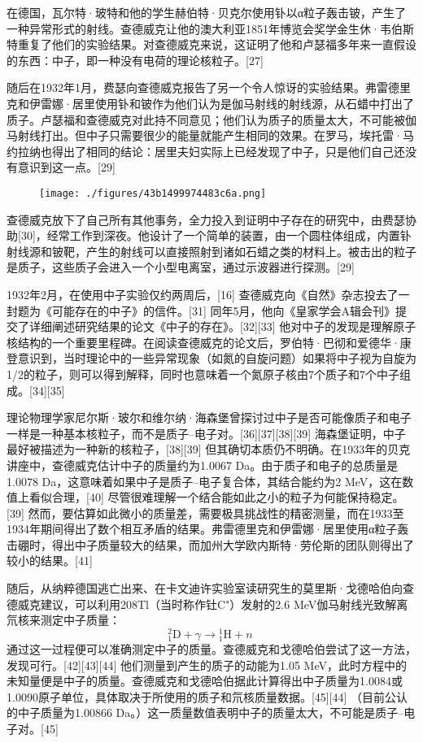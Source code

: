 在德国，瓦尔特·玻特和他的学生赫伯特·贝克尔使用钋以α粒子轰击铍，产生了一种异常形式的射线。查德威克让他的澳大利亚1851年博览会奖学金生休·韦伯斯特重复了他们的实验结果。对查德威克来说，这证明了他和卢瑟福多年来一直假设的东西：中子，即一种没有电荷的理论核粒子。[27]

随后在1932年1月，费瑟向查德威克报告了另一个令人惊讶的实验结果。弗雷德里克和伊雷娜·居里使用钋和铍作为他们认为是伽马射线的射线源，从石蜡中打出了质子。卢瑟福和查德威克对此持不同意见；他们认为质子的质量太大，不可能被伽马射线打出。但中子只需要很少的能量就能产生相同的效果。在罗马，埃托雷·马约拉纳也得出了相同的结论：居里夫妇实际上已经发现了中子，只是他们自己还没有意识到这一点。[29]
\begin{figure}[ht]
\centering
\texttt{[image: ./figures/43b1499974483c6a.png]}
\caption{} \label{fig_ZMcdw_2}
\end{figure}
查德威克放下了自己所有其他事务，全力投入到证明中子存在的研究中，由费瑟协助[30]，经常工作到深夜。他设计了一个简单的装置，由一个圆柱体组成，内置钋射线源和铍靶，产生的射线可以直接照射到诸如石蜡之类的材料上。被击出的粒子是质子，这些质子会进入一个小型电离室，通过示波器进行探测。[29]

1932年2月，在使用中子实验仅约两周后，[16] 查德威克向《自然》杂志投去了一封题为《可能存在的中子》的信件。[31] 同年5月，他向《皇家学会A辑会刊》提交了详细阐述研究结果的论文《中子的存在》。[32][33] 他对中子的发现是理解原子核结构的一个重要里程碑。在阅读查德威克的论文后，罗伯特·巴彻和爱德华·康登意识到，当时理论中的一些异常现象（如氮的自旋问题）如果将中子视为自旋为1/2的粒子，则可以得到解释，同时也意味着一个氮原子核由7个质子和7个中子组成。[34][35]

理论物理学家尼尔斯·玻尔和维尔纳·海森堡曾探讨过中子是否可能像质子和电子一样是一种基本核粒子，而不是质子–电子对。[36][37][38][39] 海森堡证明，中子最好被描述为一种新的核粒子，[38][39] 但其确切本质仍不明确。在1933年的贝克讲座中，查德威克估计中子的质量约为1.0067 Da。由于质子和电子的总质量是1.0078 Da，这意味着如果中子是质子–电子复合体，其结合能约为2 MeV，这在数值上看似合理，[40] 尽管很难理解一个结合能如此之小的粒子为何能保持稳定。[39] 然而，要估算如此微小的质量差，需要极具挑战性的精密测量，而在1933至1934年期间得出了数个相互矛盾的结果。弗雷德里克和伊雷娜·居里使用α粒子轰击硼时，得出中子质量较大的结果，而加州大学欧内斯特·劳伦斯的团队则得出了较小的结果。[41]

随后，从纳粹德国逃亡出来、在卡文迪许实验室读研究生的莫里斯·戈德哈伯向查德威克建议，可以利用208Tl（当时称作钍C"）发射的2.6 MeV伽马射线光致解离氘核来测定中子质量：
$$
{}^{2}_{1}\text{D} + \gamma \rightarrow {}^{1}_{1}\text{H} + n~
$$
通过这一过程便可以准确测定中子的质量。查德威克和戈德哈伯尝试了这一方法，发现可行。[42][43][44] 他们测量到产生的质子的动能为1.05 MeV，此时方程中的未知量便是中子的质量。查德威克和戈德哈伯据此计算得出中子质量为1.0084或1.0090原子单位，具体取决于所使用的质子和氘核质量数据。[45][44] （目前公认的中子质量为1.00866 Da。）这一质量数值表明中子的质量太大，不可能是质子–电子对。[45]

